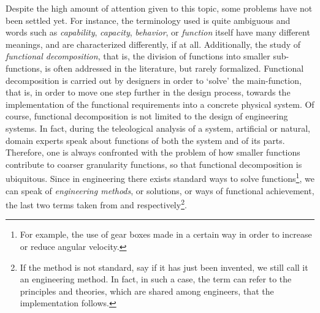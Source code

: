 \documentclass[sw]{iosart2x}
\newcommand{\firstTimeKeyWord}[1]{\textit{#1}}
\newcommand{\quotes}[1]{`#1'}
\newcommand{\myComment}[1]{}
\begin{document}
Despite the high amount of attention given to this topic, some problems have not been settled yet. 
For instance, the terminology used is quite ambiguous and words such as \firstTimeKeyWord{capability}, \firstTimeKeyWord{capacity}, \firstTimeKeyWord{behavior}, or \firstTimeKeyWord{function} itself have many different meanings, and are characterized differently, if at all\myComment{, depending on the author}.
Additionally, the study of \firstTimeKeyWord{functional decomposition}, that is, the division of functions into smaller sub-functions, is often addressed in the literature, but rarely formalized.
Functional decomposition is carried out by designers in order to \quotes{solve} the main-function, that is, in order to move one step further in the design process, towards the implementation of the functional requirements into a concrete physical system.
Of course, functional decomposition is not limited to the design of engineering systems. 
In fact, during the teleological analysis of a system, artificial or natural, domain experts speak about functions of both the system and of its parts.
Therefore, one is always confronted with the problem of how smaller functions contribute to coarser granularity functions, so that functional decomposition is ubiquitous. %
Since in engineering there exists standard ways to solve functions\footnote{For example, the use of gear boxes made in a certain way in order to increase or reduce angular velocity.}, we can speak of \firstTimeKeyWord{engineering methods}, or solutions, or ways of functional achievement, the last two terms taken from \cite{pahl_engineering_2007} and \cite{kitamuraOntologicalModelDevice2006} respectively\footnote{If the method is not standard, say if it has just been invented, we still call it an engineering method. In fact, in such a case, the term can refer to the principles and theories, which are shared among engineers, that the implementation follows.}.   
\end{document}
